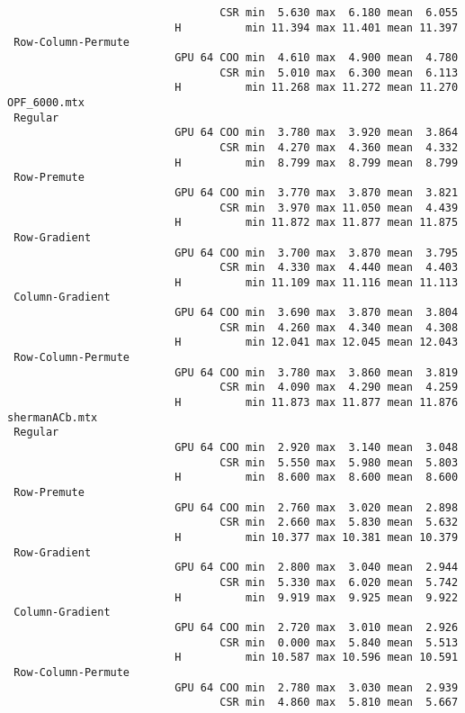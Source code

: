 {\begin{verbatim}
                                 CSR min  5.630 max  6.180 mean  6.055
                          H          min 11.394 max 11.401 mean 11.397
 Row-Column-Permute
                          GPU 64 COO min  4.610 max  4.900 mean  4.780
                                 CSR min  5.010 max  6.300 mean  6.113
                          H          min 11.268 max 11.272 mean 11.270
OPF_6000.mtx
 Regular
                          GPU 64 COO min  3.780 max  3.920 mean  3.864
                                 CSR min  4.270 max  4.360 mean  4.332
                          H          min  8.799 max  8.799 mean  8.799
 Row-Premute
                          GPU 64 COO min  3.770 max  3.870 mean  3.821
                                 CSR min  3.970 max 11.050 mean  4.439
                          H          min 11.872 max 11.877 mean 11.875
 Row-Gradient
                          GPU 64 COO min  3.700 max  3.870 mean  3.795
                                 CSR min  4.330 max  4.440 mean  4.403
                          H          min 11.109 max 11.116 mean 11.113
 Column-Gradient
                          GPU 64 COO min  3.690 max  3.870 mean  3.804
                                 CSR min  4.260 max  4.340 mean  4.308
                          H          min 12.041 max 12.045 mean 12.043
 Row-Column-Permute
                          GPU 64 COO min  3.780 max  3.860 mean  3.819
                                 CSR min  4.090 max  4.290 mean  4.259
                          H          min 11.873 max 11.877 mean 11.876
shermanACb.mtx
 Regular
                          GPU 64 COO min  2.920 max  3.140 mean  3.048
                                 CSR min  5.550 max  5.980 mean  5.803
                          H          min  8.600 max  8.600 mean  8.600
 Row-Premute
                          GPU 64 COO min  2.760 max  3.020 mean  2.898
                                 CSR min  2.660 max  5.830 mean  5.632
                          H          min 10.377 max 10.381 mean 10.379
 Row-Gradient
                          GPU 64 COO min  2.800 max  3.040 mean  2.944
                                 CSR min  5.330 max  6.020 mean  5.742
                          H          min  9.919 max  9.925 mean  9.922
 Column-Gradient
                          GPU 64 COO min  2.720 max  3.010 mean  2.926
                                 CSR min  0.000 max  5.840 mean  5.513
                          H          min 10.587 max 10.596 mean 10.591
 Row-Column-Permute
                          GPU 64 COO min  2.780 max  3.030 mean  2.939
                                 CSR min  4.860 max  5.810 mean  5.667

\end{verbatim}}

